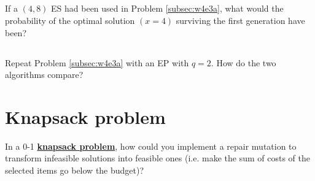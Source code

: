 \subsection{} %
If a \((4, 8)\) ES had been used in Problem \ref{subsec:w4e3a},
what would the probability of the optimal solution \((x = 4)\) surviving the first generation have been?
\subsection{\marginsymbol} %
Repeat Problem \ref{subsec:w4e3a} with an EP with \(q = 2\).
How do the two algorithms compare?
\section{Knapsack problem}
In a 0-1 \href{https://en.wikipedia.org/wiki/Knapsack_problem}{\textbf{knapsack problem}},
how could you implement a repair mutation to transform infeasible solutions into feasible ones
(i.e. make the sum of costs of the selected items go below the budget)?



